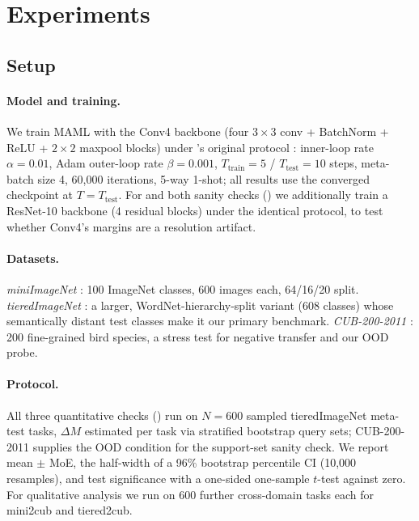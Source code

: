 \section{Experiments}
\label{sec:experiments}

\subsection{Setup}
\label{sec:setup}

\paragraph{Model and training.} We train MAML with the Conv4 backbone (four $3{\times}3$ conv + BatchNorm + ReLU + $2{\times}2$ maxpool blocks) under \citeauthor{finn2017model}'s original protocol \citep{finn2017model}: inner-loop rate $\alpha{=}0.01$, Adam outer-loop rate $\beta{=}0.001$, $T_{\text{train}}{=}5$ / $T_{\text{test}}{=}10$ steps, meta-batch size 4, 60{,}000 iterations, 5-way 1-shot; all results use the converged checkpoint at $T{=}T_{\text{test}}$. For \biadt and both sanity checks () we additionally train a ResNet-10 backbone \citep{he2016deep} (4 residual blocks) under the identical protocol, to test whether Conv4's margins are a resolution artifact.

\paragraph{Datasets.} \emph{miniImageNet} \citep{ravi2017optimization}: 100 ImageNet classes, 600 images each, 64/16/20 split. \emph{tieredImageNet} \citep{ren2018meta}: a larger, WordNet-hierarchy-split variant (608 classes) whose semantically distant test classes make it our primary benchmark. \emph{CUB-200-2011} \citep{welinder2010caltech}: 200 fine-grained bird species, a stress test for negative transfer and our OOD probe.

\paragraph{Protocol.} All three quantitative checks () run on $N{=}600$ sampled tieredImageNet meta-test tasks, $\Delta M$ estimated per task via stratified bootstrap query sets; CUB-200-2011 supplies the OOD condition for the support-set sanity check. We report mean $\pm$ MoE, the half-width of a 96\% bootstrap percentile CI (10{,}000 resamples), and test \biadt significance with a one-sided one-sample $t$-test against zero. For qualitative analysis we run \fama on 600 further cross-domain tasks each for mini2cub and tiered2cub.

